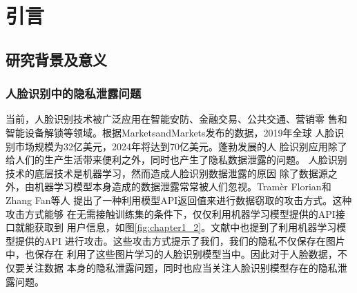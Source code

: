 
\chapter{引言}

\section{研究背景及意义}

\subsection{人脸识别中的隐私泄露问题}
当前，人脸识别技术被广泛应用在智能安防、金融交易、公共交通、营销零
售和智能设备解锁等领域。根据MarketsandMarkets发布的数据，2019年全球
人脸识别市场规模为32亿美元，2024年将达到70亿美元\cite{marketsmarkets2019}。蓬勃发展的人
脸识别应用除了给人们的生产生活带来便利之外，同时也产生了隐私数据泄露的问题\cite{baiduwangxun2020,nandugeren2020}。
人脸识别技术的底层技术是机器学习，然而造成人脸识别数据泄露的原因
除了数据源之外，由机器学习模型本身造成的数据泄露常常被人们忽视。Tram\`{e}r Florian和Zhang Fan等人\cite{10.5555/3241094.3241142}
提出了一种利用模型API返回值来进行数据窃取的攻击方式。这种攻击方式能够
在无需接触训练集的条件下，仅仅利用机器学习模型提供的API接口就能获取到
用户信息，如图\ref{fig:chapter1_2}。文献\cite{Fredrikson2015}中也提到了利用机器学习模型提供的API
进行攻击。这些攻击方式提示了我们，我们的隐私不仅保存在图片中，也保存在
利用了这些图片学习的人脸识别模型当中。因此对于人脸数据，不仅要关注数据
本身的隐私泄露问题，同时也应当关注人脸识别模型存在的隐私泄露问题。

